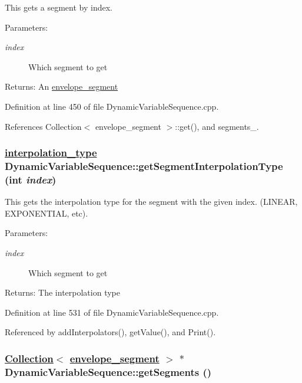 This gets a segment by index. \begin{Desc}
\item[Parameters:]
\begin{description}
\item[{\em index}]Which segment to get \end{description}
\end{Desc}
\begin{Desc}
\item[Returns:]An \hyperlink{structenvelope__segment}{envelope\_\-segment} \end{Desc}


Definition at line 450 of file Dynamic\-Variable\-Sequence.cpp.

References Collection$<$ envelope\_\-segment $>$::get(), and segments\_\-.\hypertarget{classDynamicVariableSequence_a22}{
\subsubsection[getSegmentInterpolationType]{\setlength{\rightskip}{0pt plus 5cm}\hyperlink{Types_8h_a13}{interpolation\_\-type} Dynamic\-Variable\-Sequence::get\-Segment\-Interpolation\-Type (int {\em index})}}
\label{classDynamicVariableSequence_a22}


This gets the interpolation type for the segment with the given index. (LINEAR, EXPONENTIAL, etc). \begin{Desc}
\item[Parameters:]
\begin{description}
\item[{\em index}]Which segment to get \end{description}
\end{Desc}
\begin{Desc}
\item[Returns:]The interpolation type \end{Desc}


Definition at line 531 of file Dynamic\-Variable\-Sequence.cpp.

Referenced by add\-Interpolators(), get\-Value(), and Print().\hypertarget{classDynamicVariableSequence_a11}{
\subsubsection[getSegments]{\setlength{\rightskip}{0pt plus 5cm}\hyperlink{classCollection}{Collection}$<$ \hyperlink{structenvelope__segment}{envelope\_\-segment} $>$ $\ast$ Dynamic\-Variable\-Sequence::get\-Segments ()}}
\label{classDynamicVariableSequence_a11}


